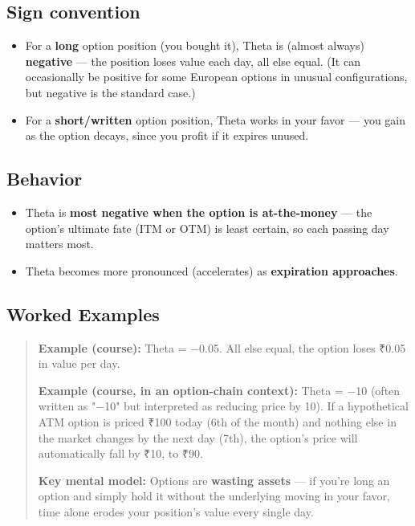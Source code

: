 \documentclass[12pt,openany]{book}
\theoremstyle{definition}
\theoremstyle{remark}
\begin{document}
\subsection{Sign convention}

\begin{itemize}
\item For a \textbf{long} option position (you bought it), Theta is (almost always) \textbf{negative} — the position loses value each day, all else equal. (It can occasionally be positive for some European options in unusual configurations, but negative is the standard case.)
\item For a \textbf{short/written} option position, Theta works in your favor — you gain as the option decays, since you profit if it expires unused.
\end{itemize}

\subsection{Behavior}

\begin{itemize}
\item Theta is \textbf{most negative when the option is at-the-money} — the option's ultimate fate (ITM or OTM) is least certain, so each passing day matters most.
\item Theta becomes more pronounced (accelerates) as \textbf{expiration approaches}.
\end{itemize}

\subsection{Worked Examples}

\begin{quote}
\textbf{Example (course):} Theta = −0.05. All else equal, the option loses ₹0.05 in value per day.

\textbf{Example (course, in an option-chain context):} Theta = −10 (often written as "−10" but interpreted as reducing price by 10). If a hypothetical ATM option is priced ₹100 today (6th of the month) and nothing else in the market changes by the next day (7th), the option's price will automatically fall by ₹10, to ₹90.

\textbf{Key mental model:} Options are \textbf{wasting assets} — if you're long an option and simply hold it without the underlying moving in your favor, time alone erodes your position's value every single day.
\end{quote}
\end{document}
